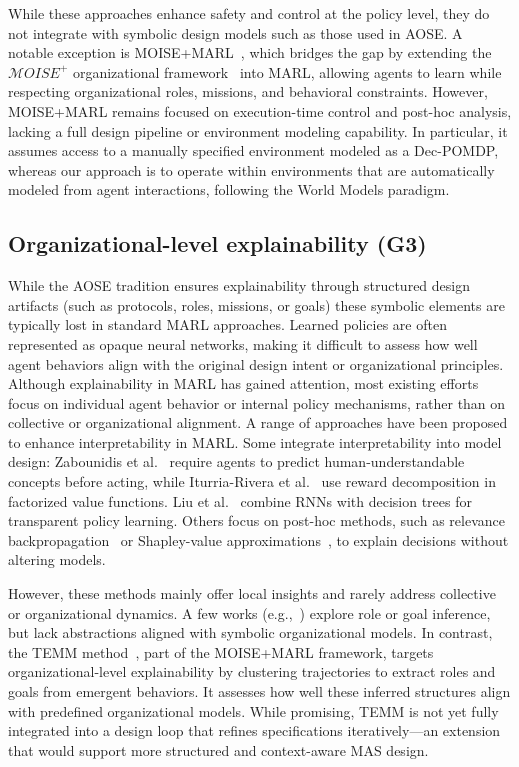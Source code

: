 \documentclass[pdflatex,sn-mathphys-num]{sn-jnl}%
\theoremstyle{thmstyleone}%
\theoremstyle{thmstyletwo}%
\theoremstyle{thmstylethree}%
\begin{document}
While these approaches enhance safety and control at the policy level, they do not integrate with symbolic design models such as those used in AOSE. A notable exception is MOISE+MARL~\cite{soule2025moisemarl}, which bridges the gap by extending the $\mathcal{M}OISE^+$ organizational framework~\cite{Hubner2002} into MARL, allowing agents to learn while respecting organizational roles, missions, and behavioral constraints. However, MOISE+MARL remains focused on execution-time control and post-hoc analysis, lacking a full design pipeline or environment modeling capability. In particular, it assumes access to a manually specified environment modeled as a Dec-POMDP, whereas our approach is to operate within environments that are automatically modeled from agent interactions, following the World Models paradigm.

\subsection{Organizational-level explainability (G3)}

While the AOSE tradition ensures explainability through structured design artifacts (such as protocols, roles, missions, or goals) these symbolic elements are typically lost in standard MARL approaches. Learned policies are often represented as opaque neural networks, making it difficult to assess how well agent behaviors align with the original design intent or organizational principles. Although explainability in MARL has gained attention, most existing efforts focus on individual agent behavior or internal policy mechanisms, rather than on collective or organizational alignment.
A range of approaches have been proposed to enhance interpretability in MARL. Some integrate interpretability into model design: Zabounidis et al.~\cite{zabounidis2023concept} require agents to predict human-understandable concepts before acting, while Iturria-Rivera et al.~\cite{iturria2024explainable} use reward decomposition in factorized value functions. Liu et al.~\cite{liu2025} combine RNNs with decision trees for transparent policy learning. Others focus on post-hoc methods, such as relevance backpropagation~\cite{poupart2025perspectives} or Shapley-value approximations~\cite{li2025from}, to explain decisions without altering models.

However, these methods mainly offer local insights and rarely address collective or organizational dynamics. A few works (e.g.,~\cite{berenji2000learning,yusuf2020inferential,serrino2019finding}) explore role or goal inference, but lack abstractions aligned with symbolic organizational models. In contrast, the TEMM method~\cite{soule2025moisemarl}, part of the MOISE+MARL framework, targets organizational-level explainability by clustering trajectories to extract roles and goals from emergent behaviors. It assesses how well these inferred structures align with predefined organizational models. While promising, TEMM is not yet fully integrated into a design loop that refines specifications iteratively—an extension that would support more structured and context-aware MAS design.
\end{document}

